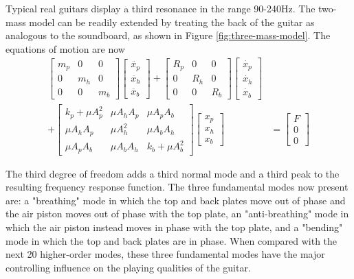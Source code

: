 \documentclass[
reprint,amsmath,amssymb,showpacs,citeautoscript,prb,twocolumn,notitlepage,floatfix
]{revtex4-1}
\begin{document}
Typical real guitars display a third resonance in the range 90-240Hz.\cite{lee2016:doi:10.1155/2016/6084230} The two-mass model can be readily extended by treating the back of the guitar as analogous to the soundboard, as shown in Figure \ref{fig:three-mass-model}. The equations of motion are now \cite{french2008engineering}
\begin{align*}
\begin{bmatrix}
m_p & 0 & 0 \\
0 & m_h & 0 \\
0 & 0 & m_b
\end{bmatrix}
\begin{bmatrix}
\ddot{x_p} \\
\ddot{x_h} \\
\ddot{x_b}
\end{bmatrix} +
\begin{bmatrix}
R_p & 0 & 0 \\
0 & R_h & 0 \\
0 & 0 & R_b
\end{bmatrix}
\begin{bmatrix}
\dot{x_p} \\
\dot{x_h} \\
\dot{x_b}
\end{bmatrix} & \\
+ 
\begin{bmatrix}
k_p + \mu A_p ^2 & \mu A_h A_p & \mu A_p A_b \\
\mu A_h A_p & \mu A_h ^2 & \mu A_b A_h \\
\mu A_p A_b & \mu A_b A_h & k_b + \mu A_b ^2
\end{bmatrix}
\begin{bmatrix}
x_p \\
x_h \\
x_b
\end{bmatrix} & = 
\begin{bmatrix}
F \\
0 \\
0
\end{bmatrix}
\end{align*}

The third degree of freedom adds a third normal mode and a third peak to the resulting frequency response function. The three fundamental modes now present are: a "breathing" mode in which the top and back plates move out of phase and the air piston moves out of phase with the top plate, an "anti-breathing" mode in which the air piston instead moves in phase with the top plate, and a "bending" mode in which the top and back plates are in phase. When compared with the next 20 higher-order modes, these three fundamental modes have the major controlling influence on the playing qualities of the guitar.\cite{richardson:hal-00811279}
\end{document}
